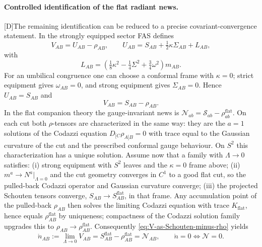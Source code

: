 \documentclass[11pt,a4paper]{article}
\newcommand{\statusD}{\textsf{[D]}}
\begin{document}
\paragraph{Controlled identification of the flat radiant news.}
\statusD The remaining identification can be reduced to a precise covariant-convergence statement.  In the strongly equipped sector FAS defines
\[
  V_{AB}=U_{AB}-\rho_{AB},\qquad
  U_{AB}=S_{AB}+\tfrac12\kappa\Sigma_{AB}+L_{AB},
\]
with
\[
  L_{AB}=\left(\tfrac18\kappa^2-\tfrac14\Sigma^2+\tfrac34\omega^2\right)m_{AB}.
\]
For an umbilical congruence one can choose a conformal frame with \(\kappa=0\); strict equipment gives \(\omega_{AB}=0\), and strong equipment gives \(\Sigma_{AB}=0\).  Hence \(U_{AB}=S_{AB}\) and
\begin{equation}\label{eq:V-as-Schouten-minus-rho}
  V_{AB}=S_{AB}-\rho_{AB}.
\end{equation}
In the flat companion theory the gauge-invariant news is \(\mathcal N_{ab}=\mathcal S_{ab}-\rho^{\mathrm{flat}}_{ab}\).  On each cut both \(\rho\)-tensors are characterized in the same way: they are the \(a=1\) solutions of the Codazzi equation \(D_{[C}\rho_{A]B}=0\) with trace equal to the Gaussian curvature of the cut and the prescribed conformal gauge behaviour.  On \(S^2\) this characterization has a unique solution.  Assume now that a family with \(\Lambda\to0\) satisfies: (i) strong equipment with \(S^2\) leaves and the \(\kappa=0\) frame above; (ii) \(m^a\to N^a|_{\Lambda=0}\) and the cut geometry converges in \(C^1\) to a good flat cut, so the pulled-back Codazzi operator and Gaussian curvature converge; (iii) the projected Schouten tensors converge, \(S_{AB}\to S^{\mathrm{flat}}_{AB}\), in that frame.  Any accumulation point of the pulled-back \(\rho_{AB}\) then solves the limiting Codazzi equation with trace \(K_{\mathrm{flat}}\), hence equals \(\rho^{\mathrm{flat}}_{AB}\) by uniqueness; compactness of the Codazzi solution family upgrades this to \(\rho_{AB}\to\rho^{\mathrm{flat}}_{AB}\).  Consequently \eqref{eq:V-as-Schouten-minus-rho} yields
\begin{equation}\label{eq:controlled-flat-news-identification}
  \mathring n_{AB}
  :=
  \lim_{\Lambda\to0}V_{AB}
  =
  S^{\mathrm{flat}}_{AB}-\rho^{\mathrm{flat}}_{AB}
  =
  \mathcal N_{AB},
  \qquad
  \mathring n=0\iff\mathcal N=0 .
\end{equation}
\end{document}
